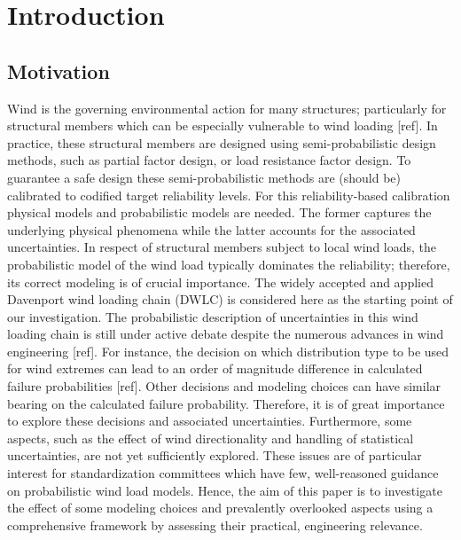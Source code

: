 \documentclass[fleqn]{article}
\begin{document}
\section{Introduction}

\subsection{Motivation}

Wind is the governing environmental action for many structures; particularly for structural members which can be especially vulnerable to wind loading [ref]. In practice, these structural members are designed using semi-probabilistic design methods, such as partial factor design, or load resistance factor design. To guarantee a safe design these semi-probabilistic methods are (should be) calibrated to codified target reliability levels. For this reliability-based calibration physical models and probabilistic models are needed. The former captures the underlying physical phenomena while the latter accounts for the associated uncertainties. In respect of structural members subject to local wind loads, the probabilistic model of the wind load typically dominates the reliability; therefore, its correct modeling is of crucial importance. The widely accepted and applied Davenport wind loading chain (DWLC) is considered here as the starting point of our investigation. The probabilistic description of uncertainties in this wind loading chain is still under active debate despite the numerous advances in wind engineering [ref]. For instance, the decision on which distribution type to be used for wind extremes can lead to an order of magnitude difference in calculated failure probabilities [ref]. Other decisions and modeling choices can have similar bearing on the calculated failure probability. Therefore, it is of great importance to explore these decisions and associated uncertainties. Furthermore, some aspects, such as the effect of wind directionality and handling of statistical uncertainties, are not yet sufficiently explored. These issues are of particular interest for standardization committees which have few, well-reasoned guidance on probabilistic wind load models. Hence, the aim of this paper is to investigate the effect of some modeling choices and prevalently overlooked aspects using a comprehensive framework by assessing their practical, engineering relevance.
\end{document}
